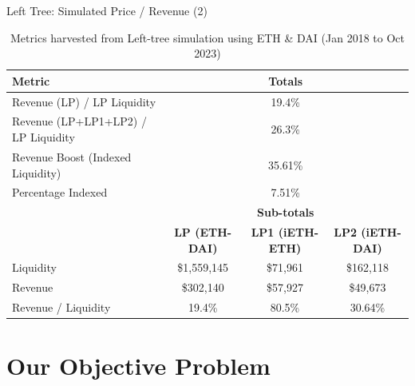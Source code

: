 \documentclass[10pt,xcolor=svgnames]{beamer} %
\begin{document}
\begin{frame}{Left Tree: Simulated Price / Revenue (2)}


\begin{table}[h]
\tiny
\centering
\begin{tabular}{ |l|c|c|c| } 
\hline
 \textbf{Metric} & \multicolumn{3}{|c|}{\textbf{Totals}}\\
\hline 
 Revenue (LP) / LP Liquidity & \multicolumn{3}{|c|}{19.4\% }\\
 Revenue (LP+LP1+LP2) / LP Liquidity & \multicolumn{3}{|c|}{26.3\% }\\
 Revenue Boost (Indexed Liquidity)  & \multicolumn{3}{|c|}{35.61\%}\\ 
 Percentage Indexed & \multicolumn{3}{|c|}{7.51\%}\\ 
 \hline
\hline
	& \multicolumn{3}{|c|}{\textbf{Sub-totals}} \\
  & \textbf{LP (ETH-DAI)} & \textbf{LP1 (iETH-ETH)} & \textbf{LP2 (iETH-DAI)} \\
\hline
Liquidity  & \$1,559,145 & \$71,961 & \$162,118\\
Revenue  & \$302,140 & \$57,927 & \$49,673\\
Revenue / Liquidity  & 19.4\% & 80.5\% & 30.64\%\\ 
\hline
\end{tabular}
\caption{Metrics harvested from Left-tree simulation using ETH \& DAI (Jan 2018 to Oct 2023)}
\label{table:simulator_components}
\end{table}

\end{frame}



\section{Our Objective Problem}
\end{document}
